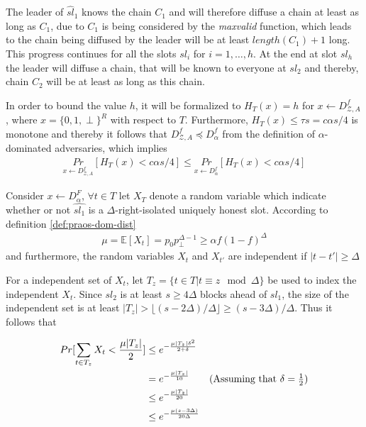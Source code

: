 The leader of $\hat{sl}_1$ knows the chain $C_1$ and will therefore diffuse a chain at least as long as $C_1$, due to $C_1$ is being considered by the \emph{maxvalid} function, which leads to the chain being diffused by the leader will be at least $length(C_1)+1$ long. This progress continues for all the slots $sl_i$ for $i = 1,\ldots, h$. At the end at slot $sl_h$ the leader will diffuse a chain, that will be known to everyone at $sl_2$ and thereby, chain $C_2$ will be at least as long as this chain.

In order to bound the value $h$, it will be formalized to $H_T(x) = h$ for $x \xleftarrow{} D^f_{\mathcal{Z},A}$, where $x=\{0,1,\perp\}^R$ with respect to $T$. Furthermore, $H_T(x) \leq \tau s = c \alpha s /4$ is monotone and thereby it follows that $D^f_{\mathcal{Z},A} \preceq D_{\alpha}^f$ from the definition of $\alpha$-dominated adversaries, which implies
\begin{align*}
    \underset{x \xleftarrow{} D^f_{\mathcal{Z},A}}{Pr} [H_T(x) < c \alpha s / 4] \leq \underset{x \xleftarrow{} D^f_{\alpha}}{Pr} [H_T(x) < c \alpha s / 4]
\end{align*}


Consider $x \xleftarrow{} D^F_{\alpha}$, $\forall t \in T$ let $X_T$ denote a random variable which indicate whether or not $\hat{sl_1}$ is a $\Delta$-right-isolated uniquely honest slot. According to definition \ref{def:praos-dom-dist}
\begin{align}
    \mu = \mathbb{E}[X_t] = p_0p_{\perp}^{\Delta-1} \geq \alpha f(1-f)^{\Delta}
\end{align}
and furthermore, the random variables $X_t$ and $X_{t'}$ are independent if $|t-t'| \geq \Delta$

For a independent set of $X_t$, let $T_z = \{t\in T | t \equiv z \mod \Delta\}$ be used to index the independent $X_t$. Since $sl_2$ is at least $s\geq 4\Delta$ blocks ahead of $sl_1$, the size of the independent set is at least $|T_z| > \lfloor (s-2\Delta)/\Delta \rfloor \geq (s-3\Delta)/\Delta$. Thus it follows that


\begin{align*}
    Pr[\sum_{t \in T_z} X_t < \frac{\mu|T_z|}{2}] &\leq e^{-\frac{\mu|T_z| \delta^2}{2+\delta}}\\
    &= e^{-\frac{\mu|T_z|}{10}} \tag{Assuming that $\delta = \frac{1}{2}$} \\
    &\leq e^{-\frac{\mu|T_z|}{20}} \\
    &\leq e^{-\frac{\mu(s-3\Delta)}{20\Delta}}
\end{align*}

